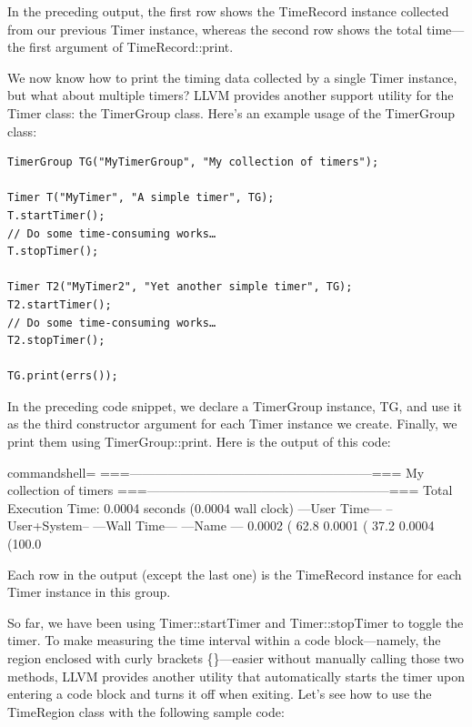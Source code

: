 In the preceding output, the first row shows the TimeRecord instance collected from our previous Timer instance, whereas the second row shows the total time—the first argument of TimeRecord::print. 

We now know how to print the timing data collected by a single Timer instance, but what about multiple timers? LLVM provides another support utility for the Timer class: the TimerGroup class. Here's an example usage of the TimerGroup class:

\begin{lstlisting}[style=styleCXX]
TimerGroup TG("MyTimerGroup", "My collection of timers");

Timer T("MyTimer", "A simple timer", TG);
T.startTimer();
// Do some time-consuming works…
T.stopTimer();

Timer T2("MyTimer2", "Yet another simple timer", TG);
T2.startTimer();
// Do some time-consuming works…
T2.stopTimer();

TG.print(errs());
\end{lstlisting}

In the preceding code snippet, we declare a TimerGroup instance, TG, and use it as the third constructor argument for each Timer instance we create. Finally, we print them using TimerGroup::print. Here is the output of this code:

\begin{tcblisting}{commandshell={}}
===---------------------------------------------------------===
                    My collection of timers
===---------------------------------------------------------===
Total Execution Time: 0.0004 seconds (0.0004 wall clock)
  ---User Time--- --User+System-- ---Wall Time--- ---Name ---
  0.0002 ( 62.8%
  0.0001 ( 37.2%
  0.0004 (100.0%
\end{tcblisting}

Each row in the output (except the last one) is the TimeRecord instance for each Timer instance in this group.

So far, we have been using Timer::startTimer and Timer::stopTimer to toggle the timer. To make measuring the time interval within a code block—namely, the region enclosed with curly brackets \{\}—easier without manually calling those two methods, LLVM provides another utility that automatically starts the timer upon entering a code block and turns it off when exiting. Let's see how to use the TimeRegion class with the following sample code:

